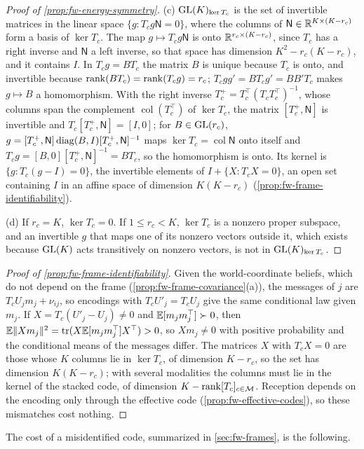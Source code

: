 \begin{proof}[Proof of \cref{prop:fw-energy-symmetry}]
(c) $\mathrm{GL}(K)_{\ker T_c}$ is the set of invertible matrices in the linear space $\{g:T_cg\mathsf N=0\}$, where the columns of $\mathsf N\in\mathbb{R}^{K\times(K-r_c)}$ form a basis of $\ker T_c$. The map $g\mapsto T_cg\mathsf N$ is onto $\mathbb{R}^{r_c\times(K-r_c)}$, since $T_c$ has a right inverse and $\mathsf N$ a left inverse, so that space has dimension $K^2-r_c(K-r_c)$, and it contains $I$. In $T_cg=BT_c$ the matrix $B$ is unique because $T_c$ is onto, and invertible because $\operatorname{rank}(BT_c)=\operatorname{rank}(T_cg)=r_c$; $T_cgg'=BT_cg'=BB'T_c$ makes $g\mapsto B$ a homomorphism. With the right inverse $T_c^+=T_c^\top(T_cT_c^\top)^{-1}$, whose columns span the complement $\operatorname{col}(T_c^\top)$ of $\ker T_c$, the matrix $[T_c^+,\mathsf N]$ is invertible and $T_c[T_c^+,\mathsf N]=[I,0]$; for $B\in\mathrm{GL}(r_c)$, $g=[T_c^+,\mathsf N]\operatorname{diag}(B,I)[T_c^+,\mathsf N]^{-1}$ maps $\ker T_c=\operatorname{col}\mathsf N$ onto itself and $T_cg=[B,0][T_c^+,\mathsf N]^{-1}=BT_c$, so the homomorphism is onto. Its kernel is $\{g:T_c(g-I)=0\}$, the invertible elements of $I+\{X:T_cX=0\}$, an open set containing $I$ in an affine space of dimension $K(K-r_c)$ (\cref{prop:fw-frame-identifiability}).

(d) If $r_c=K$, $\ker T_c=0$. If $1\le r_c<K$, $\ker T_c$ is a nonzero proper subspace, and an invertible $g$ that maps one of its nonzero vectors outside it, which exists because $\mathrm{GL}(K)$ acts transitively on nonzero vectors, is not in $\mathrm{GL}(K)_{\ker T_c}$.
\end{proof}

\begin{proof}[Proof of \cref{prop:fw-frame-identifiability}]
Given the world-coordinate beliefs, which do not depend on the frame (\cref{prop:fw-frame-covariance}(a)), the messages of $j$ are $T_cU_jm_j+\nu_{ij}$, so encodings with $T_cU'_j=T_cU_j$ give the same conditional law given $m_j$. If $X=T_c(U'_j-U_j)\ne0$ and $\mathbb{E}[m_jm_j^\top]\succ0$, then $\mathbb{E}\Vert Xm_j\Vert^2=\operatorname{tr}(X\mathbb{E}[m_jm_j^\top]X^\top)>0$, so $Xm_j\ne0$ with positive probability and the conditional means of the messages differ. The matrices $X$ with $T_cX=0$ are those whose $K$ columns lie in $\ker T_c$, of dimension $K-r_c$, so the set has dimension $K(K-r_c)$; with several modalities the columns must lie in the kernel of the stacked code, of dimension $K-\operatorname{rank}[T_c]_{c\in\mathcal M}$. Reception depends on the encoding only through the effective code (\cref{prop:fw-effective-codes}), so these mismatches cost nothing.
\end{proof}

The cost of a misidentified code, summarized in \cref{sec:fw-frames}, is the following.

